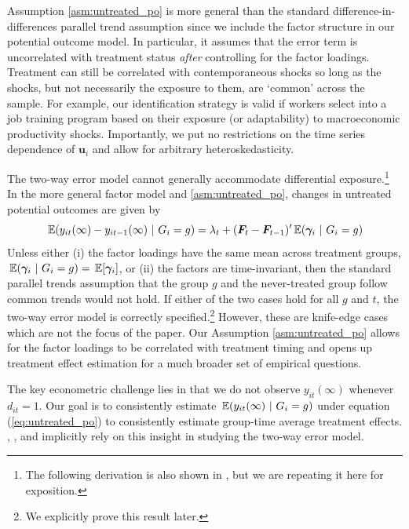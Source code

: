 \documentclass[12pt]{article}
\begin{document}
Assumption \ref{asm:untreated_po} is more general than the standard difference-in-differences parallel trend assumption since we include the factor structure in our potential outcome model. In particular, it assumes that the error term is uncorrelated with treatment status \emph{after} controlling for the factor loadings. Treatment can still be correlated with contemporaneous shocks so long as the shocks, but not necessarily the exposure to them, are `common' across the sample. For example, our identification strategy is valid if workers select into a job training program based on their exposure (or adaptability) to macroeconomic productivity shocks. Importantly, we put no restrictions on the time series dependence of $\bm u_i$ and allow for arbitrary heteroskedasticity.

The two-way error model cannot generally accommodate differential exposure.\footnote{The following derivation is also shown in \citet{Callaway_Karami_2020}, but we are repeating it here for exposition.} In the more general factor model and \autoref{asm:untreated_po}, changes in untreated potential outcomes are given by
\begin{equation*}
  \expec{y_{it}(\infty) - y_{it-1}(\infty)}{G_i = g} = \lambda_t + (\bm{F}_t - \bm{F}_{t-1})' \expec{\bm \gamma_i}{G_i = g}
\end{equation*}
Unless either (i) the factor loadings have the same mean across treatment groups, $\expec{\bm \gamma_i}{G_i = g} = \expec{\bm \gamma_i}$, or (ii) the factors are time-invariant, then the standard parallel trends assumption that the group $g$ and the never-treated group follow common trends would not hold. If either of the two cases hold for all $g$ and $t$, the two-way error model is correctly specified.\footnote{We explicitly prove this result later.} However, these are knife-edge cases which are not the focus of the paper. Our Assumption \ref{asm:untreated_po} allows for the factor loadings to be correlated with treatment timing and opens up treatment effect estimation for a much broader set of empirical questions.

The key econometric challenge lies in that we do not observe $y_{it}(\infty)$ whenever $d_{it} = 1$. Our goal is to consistently estimate $\expec{y_{it}(\infty)}{G_i = g}$ under equation (\ref{eq:untreated_po}) to consistently estimate group-time average treatment effects. \citet{Gardner_2021}, \citet{Wooldridge_2021}, and \citet{Borusyak_Jaravel_Spiess_2021} implicitly rely on this insight in studying the two-way error model. 
\end{document}
